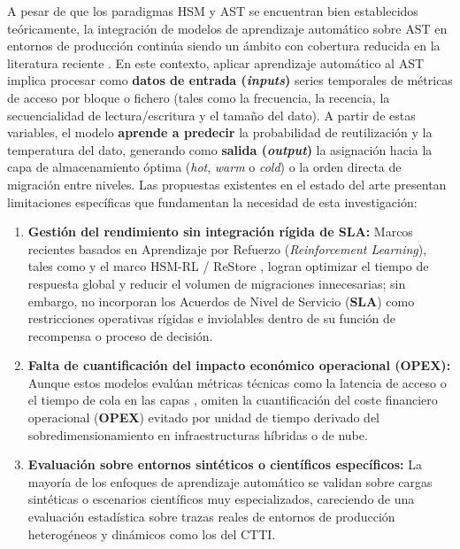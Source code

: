 A pesar de que los paradigmas HSM y AST se encuentran bien establecidos teóricamente, la integración de modelos de aprendizaje automático sobre AST en entornos de producción continúa siendo un ámbito con cobertura reducida en la literatura reciente \parencite{zhang2022efficient, zhang2023data, zhang2024autonomous}.
En este contexto, aplicar aprendizaje automático al AST implica procesar como \textbf{datos de entrada (\textit{inputs})} series temporales de métricas de acceso por bloque o fichero (tales como la frecuencia, la recencia, la secuencialidad de lectura/escritura y el tamaño del dato).
A partir de estas variables, el modelo \textbf{aprende a predecir} la probabilidad de reutilización y la temperatura del dato, generando como \textbf{salida (\textit{output})} la asignación hacia la capa de almacenamiento óptima (\textit{hot}, \textit{warm} o \textit{cold}) o la orden directa de migración entre niveles.
Las propuestas existentes en el estado del arte presentan limitaciones específicas que fundamentan la necesidad de esta investigación:
\begin{enumerate}
    \item \textbf{Gestión del rendimiento sin integración rígida de SLA:} Marcos recientes basados en Aprendizaje por Refuerzo (\textit{Reinforcement Learning}), tales como \textcite{zhang2022efficient} y el marco HSM-RL / ReStore \parencite{zhang2024autonomous, zhang2023data}, logran optimizar el tiempo de respuesta global y reducir el volumen de migraciones innecesarias; sin embargo, no incorporan los Acuerdos de Nivel de Servicio (\textbf{SLA}) como restricciones operativas rígidas e inviolables dentro de su función de recompensa o proceso de decisión.
    \item \textbf{Falta de cuantificación del impacto económico operacional (OPEX):} Aunque estos modelos evalúan métricas técnicas como la latencia de acceso o el tiempo de cola en las capas \parencite{zhang2024autonomous}, omiten la cuantificación del coste financiero operacional (\textbf{OPEX}) evitado por unidad de tiempo derivado del sobredimensionamiento en infraestructuras híbridas o de nube.
    \item \textbf{Evaluación sobre entornos sintéticos o científicos específicos:} La mayoría de los enfoques de aprendizaje automático \parencite{zhang2020cloud, kumar2021ast, zhang2023data} se validan sobre cargas sintéticas o escenarios científicos muy especializados, careciendo de una evaluación estadística sobre trazas reales de entornos de producción heterogéneos y dinámicos como los del CTTI.
\end{enumerate}

